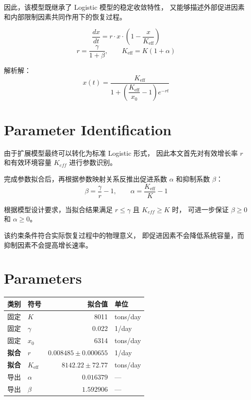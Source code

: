 \documentclass[12pt,a4paper]{article}
\begin{document}
因此，该模型既继承了 Logistic 模型的稳定收敛特性，
又能够描述外部促进因素和内部限制因素共同作用下的恢复过程。

\begin{equation}\label{eq:logistic}
\frac{dx}{dt} = r \cdot x \cdot \left(1 - \frac{x}{K_{\text{eff}}}\right)
\end{equation}
\begin{equation}
r = \frac{\gamma}{1+\beta}, \qquad K_{\text{eff}} = K(1+\alpha)
\end{equation}

解析解：
\begin{equation}\label{eq:solution}
x(t) = \frac{K_{\text{eff}}}{1 + \left(\dfrac{K_{\text{eff}}}{x_0} - 1\right) e^{-r t}}
\end{equation}

\section{Parameter Identification}

由于扩展模型最终可以转化为标准 Logistic 形式，
因此本文首先对有效增长率 $r$ 和有效环境容量 $K_{eff}$ 进行参数识别。

完成参数拟合后，再根据参数映射关系反推出促进系数 $\alpha$
和抑制系数 $\beta$：
\begin{equation}
\beta = \frac{\gamma}{r} - 1, \qquad \alpha = \frac{K_{\text{eff}}}{K} - 1
\end{equation}

根据模型设计要求，当拟合结果满足
$r\le\gamma$ 且 $K_{eff}\ge K$ 时，
可进一步保证 $\beta\ge0$ 和 $\alpha\ge0$。

该约束条件符合实际恢复过程中的物理意义，
即促进因素不会降低系统容量，而抑制因素不会提高增长速率。

\section{Parameters}

\begin{center}
\begin{tabular}{llrl}
\toprule
类别 & 符号 & 拟合值 & 单位 \\
\midrule
固定          & $K$                & 8011        & tons/day \\
固定          & $\gamma$           & 0.022       & 1/day \\
固定          & $x_0$              & 6314        & tons/day \\
\midrule
\textbf{拟合} & $r$                & $\mathbf{0.008485} \pm 0.000655$ & 1/day \\
\textbf{拟合} & $K_{\text{eff}}$   & $\mathbf{8142.22} \pm 72.77$ & tons/day \\
\midrule
导出          & $\alpha$           & $\mathbf{0.016379}$ & --- \\
导出          & $\beta$            & $\mathbf{1.592906}$ & --- \\
\bottomrule
\end{tabular}
\end{center}
\end{document}
